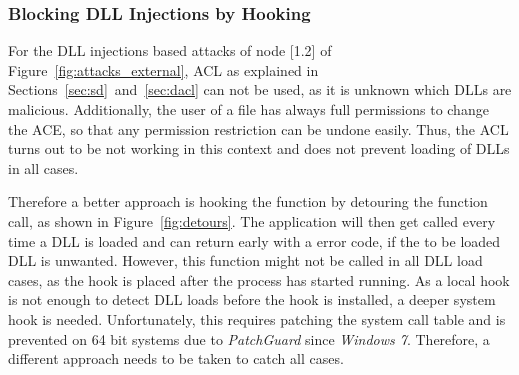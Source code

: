 \subsubsection{Blocking DLL Injections by Hooking }
For the \gls{DLL} injections based attacks of node [1.2] of Figure~\ref{fig:attacks_external}, \gls{ACL} as explained in Sections~\ref{sec:sd}~and~\ref{sec:dacl} can not be used, as it is unknown which \glspl{DLL} are malicious. Additionally, the user of a file has always full permissions to change the \gls{ACE}, so that any permission restriction can be undone easily. Thus, the \gls{ACL} turns out to be not working in this context and does not prevent loading of \glspl{DLL} in all cases. 

Therefore a better approach is hooking the  function by detouring the function call, as shown in Figure~\ref{fig:detours}. The application will then get called every time a \gls{DLL} is loaded and can return early with a  error code, if the to be loaded \gls{DLL} is unwanted. However, this function might not be called in all \gls{DLL} load cases, as the hook is placed after the process has started running. As a local hook is not enough to detect \gls{DLL} loads before the hook is installed, a deeper system hook is needed. Unfortunately, this requires patching the system call table and is prevented on 64 bit systems due to \emph{PatchGuard} since \emph{Windows 7}. Therefore, a different approach needs to be taken to catch all cases.